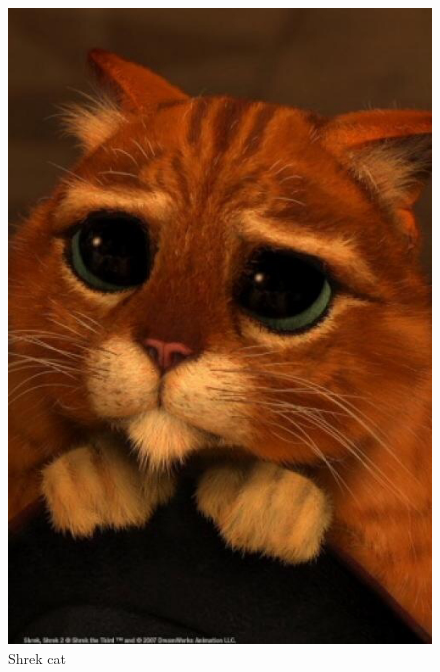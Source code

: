 \documentclass[a4paper]{article}
\begin{document}
\begin{figure}[h] %
    \centering
    \includegraphics[scale=0.1]{Shrek.jpg}
    \caption{Shrek cat}
    \label{fig:Label_cat}
\end{figure}
\end{document}
